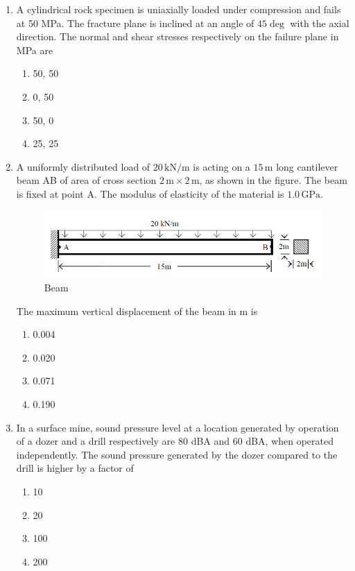 \documentclass[journal]{IEEEtran}
\begin{document}
\begin{enumerate}[leftmargin=0pt]
\item A cylindrical rock specimen is uniaxially loaded under compression and fails at 50 MPa. The
fracture plane is inclined at an angle of $45\deg$ with the axial direction. The normal and shear
stresses respectively on the failure plane in MPa are
\begin{multicols}{2}
\begin{enumerate}[label=(\Alph*), itemsep=0pt, topsep=2pt]
  \item 50, 50
  \item 0, 50
  \item 50, 0
  \item 25, 25
\end{enumerate}
\end{multicols}
\hfill{}

\item A uniformly distributed load of $20\,\text{kN/m}$ is acting on a $15\,\text{m}$ long cantilever
beam AB of area of cross section $2\,\text{m}\times 2\,\text{m}$, as shown in the figure. The beam is
fixed at point A. The modulus of elasticity of the material is $1.0\,\text{GPa}$.
\begin{figure}[H]
  \centering
  \includegraphics[width=0.65\linewidth]{figs/beam.png}
  \caption{Beam}
\end{figure}
The maximum vertical displacement of the beam in m is
\begin{multicols}{2}
\begin{enumerate}[label=(\Alph*), itemsep=0pt, topsep=2pt]
  \item 0.004
  \item 0.020
  \item 0.071
  \item 0.190
\end{enumerate}
\end{multicols}
\hfill{}

\item In a surface mine, sound pressure level at a location generated by operation of a dozer and a drill
respectively are $80$ dBA and $60$ dBA, when operated independently. The sound pressure generated
by the dozer compared to the drill is higher by a factor of
\begin{multicols}{2}
\begin{enumerate}[label=(\Alph*), itemsep=0pt, topsep=2pt]
  \item 10
  \item 20
  \item 100
  \item 200
\end{enumerate}
\end{multicols}
\hfill{}


\end{enumerate}
\end{document}
